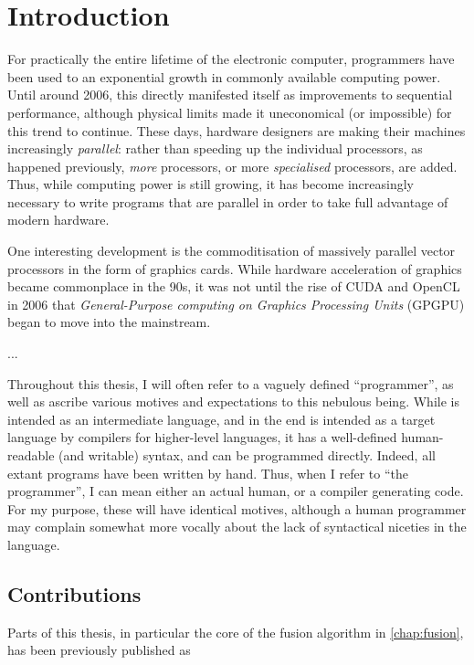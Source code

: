 \chapter{Introduction}

For practically the entire lifetime of the electronic computer,
programmers have been used to an exponential growth in commonly
available computing power.  Until around 2006, this directly
manifested itself as improvements to sequential performance, although
physical limits made it uneconomical (or impossible) for this trend to
continue.  These days, hardware designers are making their machines
increasingly \textit{parallel}: rather than speeding up the individual
processors, as happened previously, \textit{more} processors, or more
\textit{specialised} processors, are added.  Thus, while computing
power is still growing, it has become increasingly necessary to write
programs that are parallel in order to take full advantage of modern
hardware.

One interesting development is the commoditisation of massively
parallel vector processors in the form of graphics cards.  While
hardware acceleration of graphics became commonplace in the 90s, it
was not until the rise of CUDA and OpenCL in 2006 that
\textit{General-Purpose computing on Graphics Processing Units}
(GPGPU) began to move into the mainstream.

... 

Throughout this thesis, I will often refer to a vaguely defined
``programmer'', as well as ascribe various motives and expectations to
this nebulous being.  While \LO{} is intended as an intermediate
language, and in the end is intended as a target language by compilers
for higher-level languages, it has a well-defined human-readable (and
writable) syntax, and can be programmed directly.  Indeed, all extant
\LO{} programs have been written by hand.  Thus, when I refer to ``the
programmer'', I can mean either an actual human, or a compiler
generating \LO{} code.  For my purpose, these will have identical
motives, although a human programmer may complain somewhat more
vocally about the lack of syntactical niceties in the language.

\section{Contributions}


Parts of this thesis, in particular the core of the fusion algorithm
in \cref{chap:fusion}, has been previously published as

